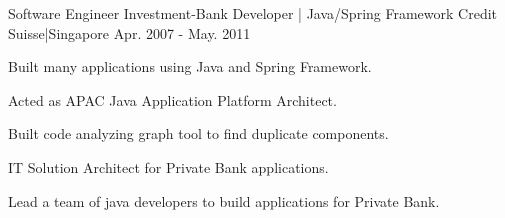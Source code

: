 \begin{cventries}
    {Software Engineer}
    {Investment-Bank Developer | Java/Spring Framework}
    {Credit Suisse|Singapore}
    {Apr. 2007 - May. 2011}
    {
      \begin{cvitems}
        \item {Built many applications using Java and Spring Framework.}
        \item {Acted as APAC Java Application Platform Architect.}
        \item {Built code analyzing graph tool to find duplicate components.}
        \item {IT Solution Architect for Private Bank applications.}
        \item {Lead a team of java developers to build applications for Private Bank.}
      \end{cvitems}
    }
\end{cventries}
